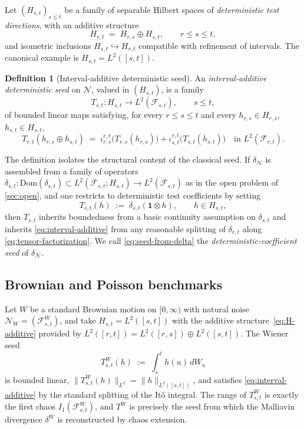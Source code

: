 \documentclass[11pt,reqno]{amsart}
\theoremstyle{plain}
\theoremstyle{definition}
\newtheorem{definition}[theorem]{Definition}
\theoremstyle{remark}
\newcommand{\Dom}{\mathrm{Dom}}
\begin{document}
Let $(H_{s,t})_{s\le t}$ be a family of separable Hilbert spaces of
\emph{deterministic test directions}, with an additive structure
\begin{equation}\label{eq:H-additive}
  H_{r,t}\;=\;H_{r,s}\oplus H_{s,t},\qquad r\le s\le t,
\end{equation}
and isometric inclusions $H_{s,t}\hookrightarrow H_{r,t}$ compatible
with refinement of intervals. The canonical example is
$H_{s,t}=L^2([s,t])$.

\begin{definition}[Interval-additive deterministic seed]\label{def:seed}
An \emph{interval-additive deterministic seed} on $\mathcal N$,
valued in $(H_{s,t})$, is a family
\[
  T_{s,t}\colon H_{s,t}\longrightarrow L^2(\mathcal F_{s,t}),
  \qquad s\le t,
\]
of bounded linear maps satisfying, for every $r\le s\le t$ and every
$h_{r,s}\in H_{r,s}$, $h_{s,t}\in H_{s,t}$,
\begin{equation}\label{eq:interval-additive}
  T_{r,t}(h_{r,s}\oplus h_{s,t})
  \;=\;
  \iota^{r,t}_{r,s}\!\bigl(T_{r,s}(h_{r,s})\bigr)
  +\iota^{r,t}_{s,t}\!\bigl(T_{s,t}(h_{s,t})\bigr)
  \quad\text{in }L^2(\mathcal F_{r,t}).
\end{equation}
\end{definition}

The definition isolates the structural content of the classical seed.
If $\delta_{\mathcal N}$ is assembled from a family of operators
$\delta_{s,t}\colon\Dom(\delta_{s,t})\subset L^2(\mathcal F_{s,t};H_{s,t})\to L^2(\mathcal F_{s,t})$
as in the open problem of \cref{sec:open}, and one restricts to
deterministic test coefficients by setting
\begin{equation}\label{eq:seed-from-delta}
  T_{s,t}(h)\;:=\;\delta_{s,t}(\mathbf 1\otimes h),
  \qquad h\in H_{s,t},
\end{equation}
then $T_{s,t}$ inherits boundedness from a basic continuity
assumption on $\delta_{s,t}$ and inherits
\eqref{eq:interval-additive} from any reasonable splitting of
$\delta_{r,t}$ along \eqref{eq:tensor-factorization}. We call
\eqref{eq:seed-from-delta} the \emph{deterministic-coefficient seed}
of $\delta_{\mathcal N}$.

\subsection{Brownian and Poisson benchmarks}\label{sec:seed-benchmarks}

Let $W$ be a standard Brownian motion on $[0,\infty)$ with natural
noise $\mathcal N_W=(\mathcal F^W_{s,t})$, and take $H_{s,t}=L^2([s,t])$
with the additive structure~\eqref{eq:H-additive} provided by
$L^2([r,t])=L^2([r,s])\oplus L^2([s,t])$. The Wiener seed
\begin{equation}\label{eq:wiener-seed}
  T^W_{s,t}(h)\;:=\;\int_s^t h(u)\,dW_u
\end{equation}
is bounded linear, $\|T^W_{s,t}(h)\|_{L^2}=\|h\|_{L^2([s,t])}$, and
satisfies \eqref{eq:interval-additive} by the standard splitting of
the It\^o integral. The range of $T^W_{s,t}$ is exactly the first
chaos $I_1(\mathcal F^W_{s,t})$, and $T^W$ is precisely the seed from
which the Malliavin divergence $\delta^W$ is reconstructed by chaos
extension.
\end{document}
